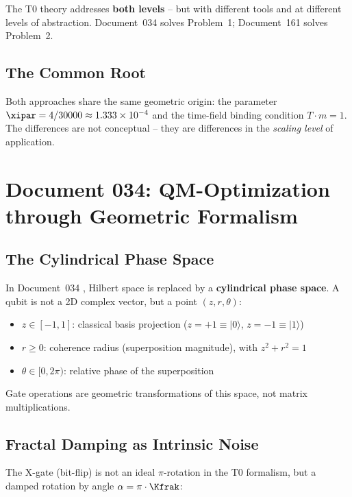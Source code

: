 The T0 theory addresses \textbf{both levels} -- but with different tools and at
different levels of abstraction. Document~034 \cite{pascher:qmopt} solves Problem~1;
Document~161 \cite{pascher:ising} solves Problem~2.

\subsection{The Common Root}

Both approaches share the same geometric origin: the parameter
$\xipar = 4/30000 \approx 1.333 \times 10^{-4}$
and the time-field binding condition $T \cdot m = 1$.
The differences are not conceptual -- they are differences in the
\emph{scaling level} of application.

\clearpage

\section{Document 034: QM-Optimization through Geometric Formalism}
\label{sec:doc034}

\subsection{The Cylindrical Phase Space}

In Document~034 \cite{pascher:qmopt}, Hilbert space is replaced by a
\textbf{cylindrical phase space}. A qubit is not a 2D complex vector, but a
point $(z, r, \theta)$:

\begin{itemize}
    \item $z \in [-1, 1]$: classical basis projection ($z=+1 \equiv |0\rangle$,
    $z=-1 \equiv |1\rangle$)
    \item $r \geq 0$: coherence radius (superposition magnitude), with $z^2 + r^2 = 1$
    \item $\theta \in [0, 2\pi)$: relative phase of the superposition
\end{itemize}

Gate operations are geometric transformations of this space, not matrix multiplications.

\subsection{Fractal Damping as Intrinsic Noise}

The X-gate (bit-flip) is not an ideal $\pi$-rotation in the T0 formalism, but a
damped rotation by angle $\alpha = \pi \cdot \Kfrak$:

